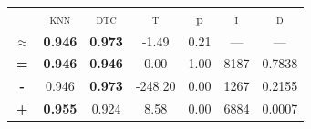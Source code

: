 \begin{tabular}{c||cc||c|c|c||c}
\midrule	&\textsc{knn} & \textsc{dtc} & \textsc{t} & p & \textsc{i} & \textsc{d}\\
	\color{black} $\approx$ & \color{black} \bfseries 0.946 &\color{black}  \bfseries 0.973 & -1.49 & 0.21 & --- & ---\\\midrule
	{\bfseries\color{black}\tiny=}& \color{black} \bfseries 0.946 & \color{black} \bfseries 0.946 & 0.00 & 1.00 & 8187 & \color{black} 0.7838\\
	{\bfseries\color{blue}\tiny-}& \color{blue}  0.946 & \color{blue} \bfseries 0.973 & -248.20 & 0.00 & 1267 & \color{blue} 0.2155\\
	{\bfseries\color{red}\tiny+}& \color{red} \bfseries 0.955 & \color{red}  0.924 & 8.58 & 0.00 & 6884 & \color{red} 0.0007\\
\bottomrule\end{tabular}


